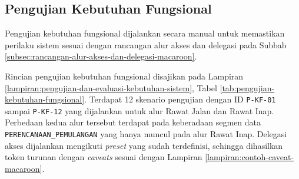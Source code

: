 \subsection{Pengujian Kebutuhan Fungsional}
\label{subsec:pengujian-kebutuhan-fungsional}

Pengujian kebutuhan fungsional dijalankan secara manual untuk memastikan perilaku sistem sesuai dengan rancangan alur akses dan delegasi pada Subbab \ref{subsec:rancangan-alur-akses-dan-delegasi-macaroon}.

Rincian pengujian kebutuhan fungsional disajikan pada Lampiran \ref{lampiran:pengujian-dan-evaluasi-kebutuhan-sistem}, Tabel \ref{tab:pengujian-kebutuhan-fungsional}. Terdapat 12 skenario pengujian dengan ID \texttt{P-KF-01} sampai \texttt{P-KF-12} yang dijalankan untuk alur Rawat Jalan dan Rawat Inap. Perbedaan kedua alur tersebut terdapat pada keberadaan segmen data \texttt{PERENCANAAN\_PEMULANGAN} yang hanya muncul pada alur Rawat Inap. Delegasi akses dijalankan mengikuti \textit{preset} yang sudah terdefinisi, sehingga dihasilkan token turunan dengan \textit{caveats} sesuai dengan Lampiran \ref{lampiran:contoh-caveat-macaroon}.